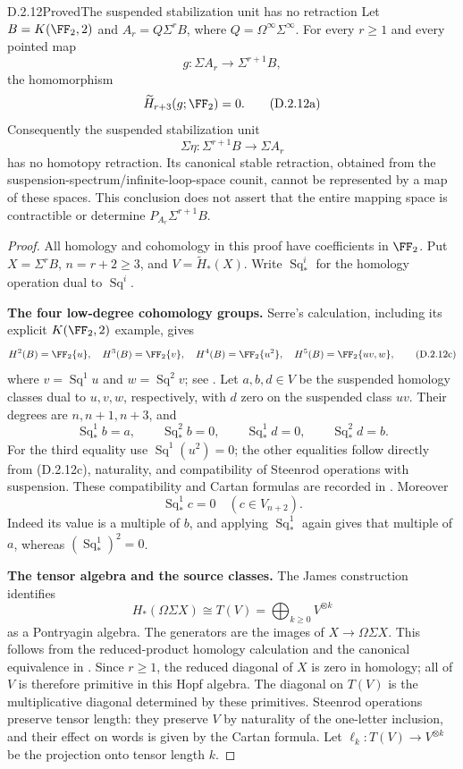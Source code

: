 \begin{claim}{D.2.12}{Proved}{The suspended stabilization unit has no retraction}
Let $B=K(\FF_2,2)$ and $A_r=Q\Sigma^rB$, where
$Q=\Omega^\infty\Sigma^\infty$. For every $r\geq1$ and every
pointed map
\[
 g:\Sigma A_r\longrightarrow\Sigma^{r+1}B,
\]
the homomorphism
\[
 \widetilde H_{r+3}(g;\FF_2)=0.
 \tag{D.2.12a}
\]
Consequently the suspended stabilization unit
\[
 \Sigma\eta:\Sigma^{r+1}B\longrightarrow\Sigma A_r
 \tag{D.2.12b}
\]
has no homotopy retraction. Its canonical stable retraction,
obtained from the suspension-spectrum/infinite-loop-space
counit, cannot be represented by a map of these spaces.
This conclusion does not assert that the entire mapping space
is contractible or determine $P_{A_r}\Sigma^{r+1}B$.
\end{claim}
\begin{proof}
All homology and cohomology in this proof have coefficients in
$\FF_2$. Put $X=\Sigma^rB$, $n=r+2\geq3$, and
$V=\widetilde H_*(X)$. Write $\operatorname{Sq}_*^i$ for the
homology operation dual to $\operatorname{Sq}^i$.

\medskip\noindent
\textbf{The four low-degree cohomology groups.}
Serre's calculation, including its explicit $K(\FF_2,2)$
example, gives
\[
 H^2(B)=\FF_2\{u\},\quad
 H^3(B)=\FF_2\{v\},\quad
 H^4(B)=\FF_2\{u^2\},\quad
 H^5(B)=\FF_2\{uv,w\},
 \tag{D.2.12c}
\]
where $v=\operatorname{Sq}^1u$ and
$w=\operatorname{Sq}^2v$; see
\cite[\S2, no.~8, Theorem~2 and no.~9, pp.~203--204]{I_Serre1953}.
Let $a,b,d\in V$ be the suspended homology classes dual to
$u,v,w$, respectively, with $d$ zero on the suspended class
$uv$. Their degrees are $n,n+1,n+3$, and
\[
 \operatorname{Sq}_*^1b=a,\qquad
 \operatorname{Sq}_*^2b=0,\qquad
 \operatorname{Sq}_*^1d=0,\qquad
 \operatorname{Sq}_*^2d=b.
 \tag{D.2.12d}
\]
For the third equality use
$\operatorname{Sq}^1(u^2)=0$; the other equalities follow
directly from \textup{(D.2.12c)}, naturality, and compatibility
of Steenrod operations with suspension. These compatibility and
Cartan formulas are recorded in
\cite[\S1, nos.~2.1--2.3, p.~199]{I_Serre1953}.
Moreover
\[
 \operatorname{Sq}_*^1c=0\quad(c\in V_{n+2}).
 \tag{D.2.12e}
\]
Indeed its value is a multiple of $b$, and applying
$\operatorname{Sq}_*^1$ again gives that multiple of $a$,
whereas $(\operatorname{Sq}_*^1)^2=0$.

\medskip\noindent
\textbf{The tensor algebra and the source classes.}
The James construction identifies
\[
 H_*(\Omega\Sigma X)\cong T(V)
       =\bigoplus_{k\geq0}V^{\otimes k}
 \tag{D.2.12f}
\]
as a Pontryagin algebra. The generators are the images of
$X\to\Omega\Sigma X$. This follows from the reduced-product
homology calculation and the canonical equivalence in
\cite[\S3, especially (3.3)--(3.4); Theorem~5.6,
Corollary~5.7 and Lemma~5.5]{I_James1955}.
Since $r\geq1$, the reduced diagonal of $X$ is zero in homology;
all of $V$ is therefore primitive in this Hopf algebra. The
diagonal on $T(V)$ is the multiplicative diagonal determined by
these primitives. Steenrod operations preserve tensor length:
they preserve $V$ by naturality of the one-letter inclusion,
and their effect on words is given by the Cartan formula.
Let $\ell_k:T(V)\to V^{\otimes k}$ be the projection onto
tensor length $k$.


\end{proof}

